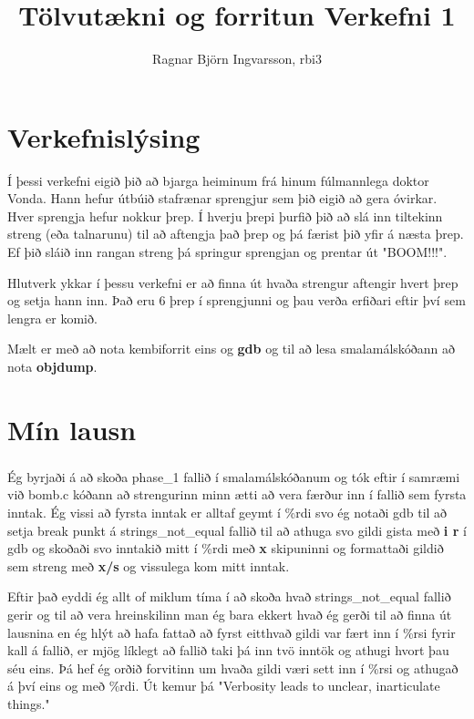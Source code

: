 \documentclass{article}
\title{Tölvutækni og forritun Verkefni 1}
\author{Ragnar Björn Ingvarsson, rbi3}
\begin{document}
\renewcommand\thepage{}
	
	\maketitle

	\newpage
	\setcounter{page}{1}
	\renewcommand\thepage{\arabic{page}}

	\part{Verkefnislýsing}
	Í þessi verkefni eigið þið að bjarga heiminum frá hinum
	fúlmannlega doktor Vonda. Hann hefur útbúið stafrænar
	sprengjur sem þið eigið að gera óvirkar. Hver
	sprengja hefur nokkur þrep. Í hverju þrepi þurfið þið að slá
	inn tiltekinn streng (eða talnarunu) til að aftengja það þrep og
	þá færist þið yfir á næsta þrep. Ef þið sláið inn rangan streng
	þá springur sprengjan og prentar út "BOOM!!!".

	Hlutverk ykkar í þessu verkefni er að finna út hvaða strengur aftengir 
	hvert þrep og setja hann inn. Það eru 6 þrep í sprengjunni og þau 
	verða erfiðari eftir því sem lengra er komið.

	Mælt er með að nota kembiforrit eins og \textbf{gdb} og til að lesa 
	smalamálskóðann að nota \textbf{objdump}. 

	\part{Mín lausn}

	\section{}
	Ég byrjaði á að skoða phase\_1 fallið í smalamálskóðanum og tók eftir 
	í samræmi við bomb.c kóðann að strengurinn minn ætti að vera færður inn 
	í fallið sem fyrsta inntak. Ég vissi að fyrsta inntak er alltaf geymt 
	í \%rdi svo ég notaði gdb til að setja break punkt á strings\_not\_equal 
	fallið til að athuga svo gildi gista með \textbf{i r} í gdb og skoðaði 
	svo inntakið mitt í \%rdi með \textbf{x} skipuninni og formattaði 
	gildið sem streng með \textbf{x/s} og vissulega kom mitt inntak.

	Eftir það eyddi ég allt of miklum tíma í að skoða hvað 
	strings\_not\_equal fallið gerir og til að vera hreinskilinn man ég bara 
	ekkert hvað ég gerði til að finna út lausnina en ég hlýt að hafa fattað 
	að fyrst eitthvað gildi var fært inn í \%rsi fyrir kall á fallið, 
	er mjög líklegt að fallið taki þá inn tvö inntök og athugi hvort þau 
	séu eins. Þá hef ég orðið forvitinn um hvaða gildi væri sett inn í 
	\%rsi og athugað á því eins og með \%rdi. Út kemur þá 
	"Verbosity leads to unclear, inarticulate things."
\end{document}
